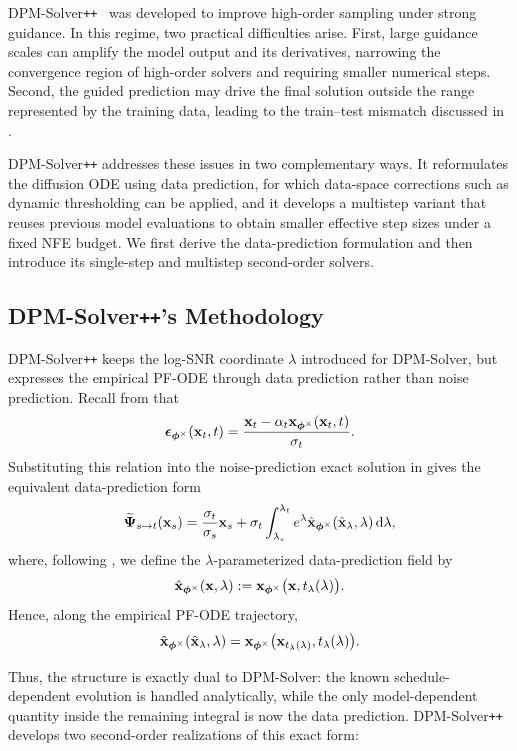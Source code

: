 DPM-Solver\texttt{++}~\citep{lu2022dpm2} was developed to improve
high-order sampling under strong guidance. In this regime, two practical
difficulties arise. First, large guidance scales can amplify the model output
and its derivatives, narrowing the convergence region of high-order solvers
and requiring smaller numerical steps. Second, the guided prediction may
drive the final solution outside the range represented by the training data,
leading to the train--test mismatch discussed in
.

DPM-Solver\texttt{++} addresses these issues in two complementary ways. It
reformulates the diffusion ODE using data prediction, for which data-space
corrections such as dynamic thresholding can be applied, and it develops a
multistep variant that reuses previous model evaluations to obtain smaller
effective step sizes under a fixed NFE budget. We first derive the
data-prediction formulation and then introduce its single-step and multistep
second-order solvers.


\subsection{DPM-Solver\texttt{++}'s Methodology}

DPM-Solver\texttt{++} keeps the log-SNR coordinate $\lambda$ introduced for
DPM-Solver, but expresses the empirical PF-ODE through data prediction rather
than noise prediction. Recall from  that
\[
{\bm{\epsilon}}_{\bm{\phi}^\times}({\mathbf{x}}_t,t)
=
\frac{
{\mathbf{x}}_t-\alpha_t{\mathbf{x}}_{\bm{\phi}^\times}({\mathbf{x}}_t,t)
}{
\sigma_t
}.
\]
Substituting this relation into the noise-prediction exact solution in
 gives the equivalent data-prediction form
\begin{equation}
\label{eq:dpmpp-data-exact}
\widetilde{{\bm{\Psi}}}_{s\to t}({\mathbf{x}}_s)
=
\frac{\sigma_t}{\sigma_s}{\mathbf{x}}_s
+
\sigma_t
\int_{\lambda_s}^{\lambda_t}
e^\lambda
\hat{{\mathbf{x}}}_{\bm{\phi}^\times}
(\hat{{\mathbf{x}}}_\lambda,\lambda)
\mathop{}\!\mathrm{d}\lambda,
\end{equation}
where, following , we define the
$\lambda$-parameterized data-prediction field by
\[
\hat{{\mathbf{x}}}_{\bm{\phi}^\times}
({\mathbf{x}},\lambda)
:=
{\mathbf{x}}_{\bm{\phi}^\times}
\bigl(
{\mathbf{x}},
t_\lambda(\lambda)
\bigr).
\]
Hence, along the empirical PF-ODE trajectory,
\[
\hat{{\mathbf{x}}}_{\bm{\phi}^\times}
(\hat{{\mathbf{x}}}_\lambda,\lambda)
=
{\mathbf{x}}_{\bm{\phi}^\times}
\bigl(
{\mathbf{x}}_{t_\lambda(\lambda)},
t_\lambda(\lambda)
\bigr).
\]

Thus, the structure is exactly dual to DPM-Solver: the known
schedule-dependent evolution is handled analytically, while the only
model-dependent quantity inside the remaining integral is now the data
prediction. DPM-Solver\texttt{++} develops two second-order realizations of
this exact form:

